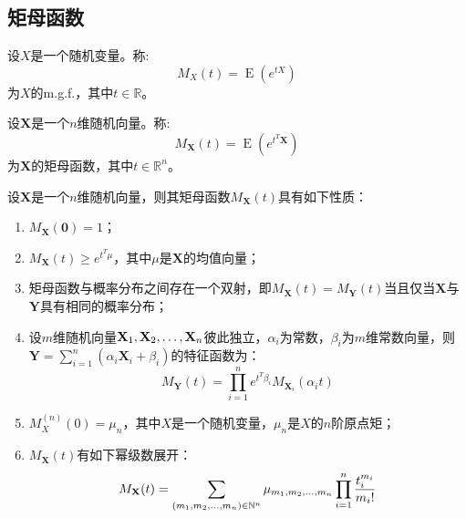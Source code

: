 \subsection{矩母函数}
\begin{definition}
	设$X$是一个随机变量。称:
	\begin{equation*}
		M_X(t)=\operatorname{E}(e^{tX})
	\end{equation*}
	为$X$的\gls{m.g.f.}，其中$t\in\mathbb{R}$。
\end{definition}
\begin{definition}
	设$\mathbf{X}$是一个$n$维随机向量。称:
	\begin{equation*}
		M_\mathbf{X}(t)=\operatorname{E}(e^{t^T\mathbf{X}})
	\end{equation*}
	为$\mathbf{X}$的矩母函数，其中$t\in\mathbb{R}^{n}$。
\end{definition}
\begin{property}\label{prop:m.g.f.}
	设$\mathbf{X}$是一个$n$维随机向量，则其矩母函数$M_\mathbf{X}(t)$具有如下性质：
	\begin{enumerate}
		\item $M_\mathbf{X}(\mathbf{0})=1$；
		\item $M_\mathbf{X}(t)\geqslant e^{t^T\mu}$，其中$\mu$是$\mathbf{X}$的均值向量；
		\item 矩母函数与概率分布之间存在一个双射，即$M_\mathbf{X}(t)=M_\mathbf{Y}(t)$当且仅当$\mathbf{X}$与$\mathbf{Y}$具有相同的概率分布；
		\item 设$m$维随机向量$\mathbf{X}_1, \mathbf{X}_2, \dots, \mathbf{X}_{n}$彼此独立，$\alpha_i$为常数，$\beta_i$为$m$维常数向量，则$\mathbf{Y}=\sum\limits_{i=1}^{n}(\alpha_i\mathbf{X}_i+\beta_i)$的特征函数为：
		\begin{equation*}
			M_\mathbf{Y}(t)=\prod_{i=1}^ne^{t^T\beta_i}M_{\mathbf{X}_i}(\alpha_it)
		\end{equation*}
		\item $M_X^{(n)}(0)=\mu_n$，其中$X$是一个随机变量，$\mu_n$是$X$的$n$阶原点矩；
		\item $M_\mathbf{X}(t)$有如下幂级数展开：
		\begin{equation*}
			M_\mathbf{X}(t)=\sum_{(m_1, m_2, \dots, m_{n})\in\mathbb{N}^n}\mu_{m_1, m_2, \dots, m_{n}}\prod_{i=1}^{n}\frac{t_i^{m_i}}{m_i!}
		\end{equation*}
	\end{enumerate}
\end{property}

